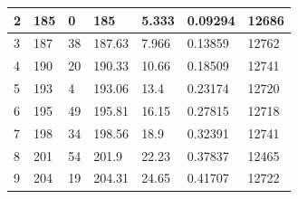 \documentclass[a4paper, 11pt]{article}
\begin{document}
\begin{center}
\begin{tabular}{|l|l|l|l|l|l|l|}
		2    & 185                           & 0                      & 185                           & 5.333                    & 0.09294                & 12686    \\ \hline
		3    & 187                           & 38                     & 187.63                        & 7.966                    & 0.13859                & 12762    \\ \hline
		4    & 190                           & 20                     & 190.33                        & 10.66                    & 0.18509                & 12741    \\ \hline
		5    & 193                           & 4                      & 193.06                        & 13.4                     & 0.23174                & 12720    \\ \hline
		6    & 195                           & 49                     & 195.81                        & 16.15                    & 0.27815                & 12718    \\ \hline
		7    & 198                           & 34                     & 198.56                        & 18.9                     & 0.32391                & 12741    \\ \hline
		8    & 201                           & 54                     & 201.9                         & 22.23                    & 0.37837                & 12465    \\ \hline
		9    & 204                           & 19                     & 204.31                        & 24.65                    & 0.41707                & 12722    \\ \hline
	\end{tabular}
\end{center}
\end{document}
